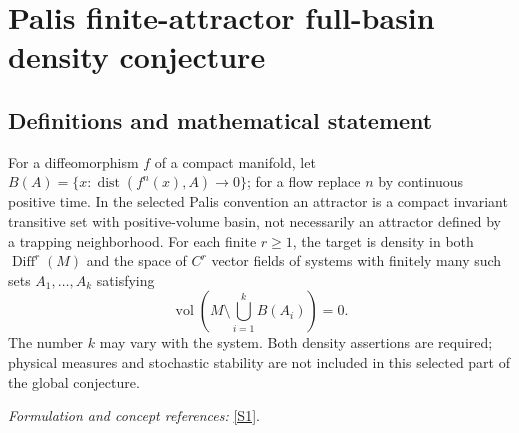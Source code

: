 \documentclass[11pt,a4paper]{article}
\newcommand{\sref}[2]{\hyperlink{source:#1:#2}{[S#2]}}
\newif\ifshowcatalogue
\newcommand{\cataloguescope}[1]{\ifshowcatalogue
 \paragraph{Exact scope in the supplied catalogue.}
 \begin{quote}\small #1\end{quote}\fi}
\begin{document}
\setcounter{section}{204}
\clearpage
\section{\texorpdfstring{Palis finite-attractor full-basin density conjecture}{Palis finite-attractor full-basin density conjecture}}\label{205}
\subsection{Definitions and mathematical statement}
For a diffeomorphism $f$ of a compact manifold, let
$B(A)=\{x:\operatorname{dist}(f^n(x),A)\to0\}$; for a flow replace $n$ by continuous positive time. In the selected Palis convention an attractor is a compact invariant transitive set with positive-volume basin, not necessarily an attractor defined by a trapping neighborhood. For each finite $r\ge1$, the target is density in both $\operatorname{Diff}^r(M)$ and the space of $C^r$ vector fields of systems with finitely many such sets $A_1,\ldots,A_k$ satisfying
\[
 \operatorname{vol}\left(M\setminus\bigcup_{i=1}^k B(A_i)\right)=0.
\]
The number $k$ may vary with the system. Both density assertions are required; physical measures and stochastic stability are not included in this selected part of the global conjecture.
\par\smallskip\textit{Formulation and concept references:} \sref{205}{1}.
\cataloguescope{For every compact connected boundaryless smooth manifold M and every finite integer r >= 1, prove the conjunction of the following two density assertions: (i) in Diff\textasciicircum{}r(M) with its C\textasciicircum{}r topology there is a dense subset D whose elements f have finitely many attractors whose basins of attraction together cover M up to a set of smooth-volume measure zero; (ii) the same holds in the space X\textasciicircum{}r(M) of C\textasciicircum{}r vector fields with its C\textasciicircum{}r topology, for the attractors and basins of the generated flows. Attractor follows Palis (2005) Sections 2.1 and 2.3: a compact invariant set A that is transitive (has a dense orbit) and attracts a set of positive volume, its basin being the set of points whose forward orbit (or forward flow trajectory) converges to A. The finite number of attractors may depend on the element of D; no uniform bound is required. Volume-zero is independent of the choice of smooth positive density on M. This is the first bullet of Palis's Global Conjecture only; physical measures, stochastic stability, metric stability under parameter perturbation, and one-dimensional-family statements are separate conjectures not included.}
\end{document}
